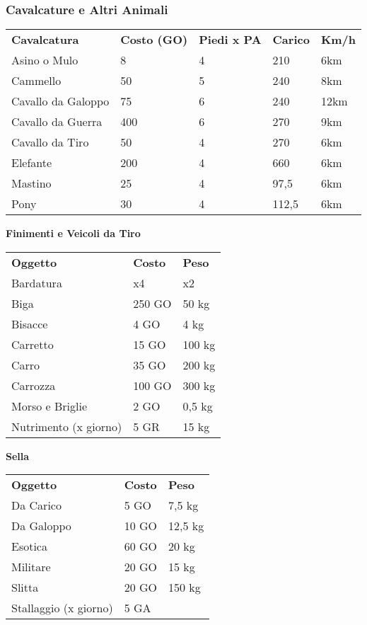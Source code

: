 \documentclass[12pt,a4paper,twoside,openany]{book}
\begin{document}
\subsubsection{Cavalcature e Altri Animali}

\begin{center}
	\begin{tabular}{lllll}
\toprule
\textbf{Cavalcatura}&\textbf{Costo (GO)}&\textbf{Piedi x PA} &\textbf{Carico} &\textbf{Km/h}\\
Asino o Mulo&8&4&210&6km\\
Cammello&50&5&240&8km\\
Cavallo da Galoppo&75&6&240&12km\\
Cavallo da Guerra&400&6&270&9km\\
Cavallo da Tiro&50&4&270&6km\\
Elefante&200&4&660&6km\\
Mastino&25&4&97,5&6km\\
Pony&30&4&112,5&6km\\
\end{tabular}
\end{center}

\bigskip

\begin{multicols}{2}

\textbf{Finimenti e Veicoli da Tiro}\\
\begin{tabularx}{0.45\textwidth}{lll}
\toprule
\textbf{Oggetto}&\textbf{Costo}&\textbf{Peso}\\
Bardatura&x4&x2\\
Biga&250 GO&50 kg\\
Bisacce&4 GO&4 kg\\
Carretto&15 GO&100 kg\\
Carro&35 GO&200 kg\\
Carrozza&100 GO&300 kg\\
Morso e Briglie&2 GO&0,5 kg\\
Nutrimento (x giorno)&5 GR&15 kg\\
\end{tabularx}

\bigskip

\textbf{Sella}\\
\begin{tabularx}{0.45\textwidth}{lll}
\toprule
\textbf{Oggetto}&\textbf{Costo}&\textbf{Peso}\\
Da Carico&5 GO&7,5 kg\\
Da Galoppo&10 GO&12,5 kg\\
Esotica&60 GO&20 kg\\
Militare&20 GO&15 kg\\
Slitta&20 GO&150 kg\\
Stallaggio (x giorno)&5 GA&\\
\end{tabularx}

\end{multicols}
\end{document}
